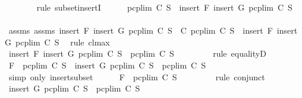 \begin{isabellebody}
\ \ \ \ \ \ \isamarkupfalse%
\ {\isacharparenleft}rule\ subset{\isacharunderscore}insertI{}{\isacharparenright}\isanewline
\ \ \ \ \isamarkupfalse%
\ {\isachardoublequoteopen}pcp{\isacharunderscore}lim\ C\ S\ {\isacharequal}\ insert\ F\ {\isacharparenleft}insert\ G\ {\isacharparenleft}pcp{\isacharunderscore}lim\ C\ S{\isacharparenright}{\isacharparenright}{\isachardoublequoteclose}\ \isanewline
\ \ \ \ \ \ \isamarkupfalse%
\ assms{\isacharparenleft}{}{\isacharparenright}\ assms{\isacharparenleft}{}{\isacharparenright}\ {\isacartoucheopen}insert\ F\ {\isacharparenleft}insert\ G\ {\isacharparenleft}pcp{\isacharunderscore}lim\ C\ S{\isacharparenright}{\isacharparenright}\ {\isasymin}\ C{\isacartoucheclose}\ {\isacartoucheopen}pcp{\isacharunderscore}lim\ C\ S\ {\isasymsubseteq}\ insert\ F\ {\isacharparenleft}insert\ G\ {\isacharparenleft}pcp{\isacharunderscore}lim\ C\ S{\isacharparenright}{\isacharparenright}{\isacartoucheclose}\ \isamarkupfalse%
\ {\isacharparenleft}rule\ cl{\isacharunderscore}max{\isacharparenright}\isanewline
\ \ \ \ \isamarkupfalse%
\ \isamarkupfalse%
\ {\isachardoublequoteopen}insert\ F\ {\isacharparenleft}insert\ G\ {\isacharparenleft}pcp{\isacharunderscore}lim\ C\ S{\isacharparenright}{\isacharparenright}\ {\isasymsubseteq}\ pcp{\isacharunderscore}lim\ C\ S{\isachardoublequoteclose}\ \isanewline
\ \ \ \ \ \ \isamarkupfalse%
\ {\isacharparenleft}rule\ equalityD{}{\isacharparenright}\isanewline
\ \ \ \ \isamarkupfalse%
\ \isamarkupfalse%
\ {}{\isacharcolon}{\isachardoublequoteopen}F\ {\isasymin}\ pcp{\isacharunderscore}lim\ C\ S\ {\isasymand}\ {\isacharparenleft}insert\ G\ {\isacharparenleft}pcp{\isacharunderscore}lim\ C\ S{\isacharparenright}{\isacharparenright}\ {\isasymsubseteq}\ pcp{\isacharunderscore}lim\ C\ S{\isachardoublequoteclose}\ \isanewline
\ \ \ \ \ \ \isamarkupfalse%
\ {\isacharparenleft}simp\ only{\isacharcolon}\ insert{\isacharunderscore}subset{\isacharparenright}\isanewline
\ \ \ \ \isamarkupfalse%
\ {\isachardoublequoteopen}F\ {\isasymin}\ pcp{\isacharunderscore}lim\ C\ S{\isachardoublequoteclose}\ \isanewline
\ \ \ \ \ \ \isamarkupfalse%
\ {\isacharparenleft}rule\ conjunct{}{\isacharparenright}\isanewline
\ \ \ \ \isamarkupfalse%
\ {\isachardoublequoteopen}insert\ G\ {\isacharparenleft}pcp{\isacharunderscore}lim\ C\ S{\isacharparenright}\ {\isasymsubseteq}\ pcp{\isacharunderscore}lim\ C\ S{\isachardoublequoteclose}\ \isanewline

\end{isabellebody}
